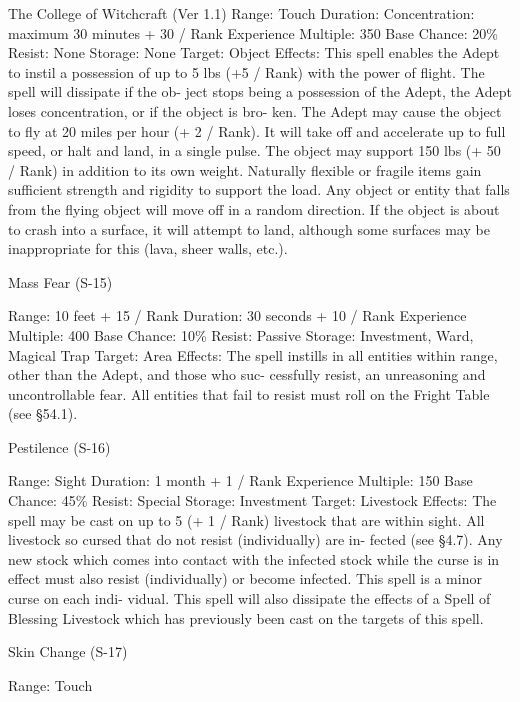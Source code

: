 \begin{Chapter}{The College of Witchcraft (Ver 1.1)}
Range: Touch 
Duration:  Concentration:  maximum  30  minutes  + 
30 / Rank 
Experience Multiple: 350 
Base Chance: 20\% 
Resist: None 
Storage: None 
Target: Object 
Effects:  This  spell  enables  the  Adept  to  instil  a 
possession  of  up  to  5  lbs  (+5  /  Rank)  with  the 
power  of  flight.  The  spell  will  dissipate  if  the  ob-
ject  stops  being  a  possession  of  the  Adept,  the 
Adept  loses  concentration,  or  if  the  object  is  bro-
ken.  The  Adept  may  cause  the  object  to  fly  at  20 
miles  per  hour  (+  2  /  Rank).  It  will  take  off  and 
accelerate  up  to  full  speed,  or  halt  and  land,  in  a 
single pulse. The object may support 150 lbs (+ 50 
/  Rank)  in  addition  to  its  own  weight.  Naturally 
flexible or fragile items gain sufficient strength and 
rigidity  to  support  the  load.  Any  object  or  entity 
that falls from the flying object will  move off in a 
random  direction.  If  the  object  is  about  to  crash 
into  a  surface,  it  will  attempt  to  land,  although 
some  surfaces  may  be  inappropriate  for  this  (lava, 
sheer walls, etc.). 

Mass Fear (S-15) 

Range: 10 feet + 15 / Rank 
Duration: 30 seconds + 10 / Rank 
Experience Multiple: 400 
Base Chance: 10\% 
Resist: Passive 
Storage: Investment, Ward, Magical Trap 
Target: Area 
Effects:  The  spell  instills  in  all  entities  within 
range,  other  than  the  Adept,  and  those  who  suc-
cessfully  resist,  an  unreasoning  and uncontrollable 
fear.  All  entities  that  fail to  resist  must  roll  on  the 
Fright Table (see §54.1). 

Pestilence (S-16) 

Range: Sight 
Duration: 1 month + 1 / Rank 
Experience Multiple: 150 
Base Chance: 45\% 
Resist: Special 
Storage: Investment 
Target: Livestock 
Effects:  The  spell  may  be  cast  on  up  to  5  (+  1  / 
Rank) livestock that are within sight. All livestock 
so  cursed  that  do  not  resist  (individually)  are  in-
fected (see §4.7). Any new stock which comes into 
contact with the infected stock while the curse is in 
effect  must  also  resist  (individually)  or  become 
infected.  This  spell  is  a  minor  curse  on  each  indi-
vidual. This spell will also dissipate the effects of a 
Spell  of  Blessing  Livestock  which  has  previously 
been cast on the targets of this spell. 

Skin Change (S-17) 

Range: Touch 


\end{Chapter}
